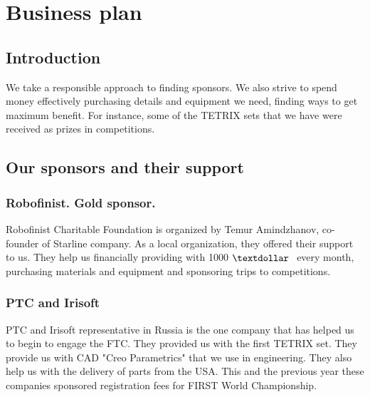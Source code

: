 \section{Business plan}
	\subsection{Introduction}
	We take a responsible approach to finding sponsors. We also strive to spend money effectively purchasing details and equipment we need, finding ways to get maximum benefit. For instance, some of the TETRIX sets that we have were received as prizes in competitions.
	
	\subsection{Our sponsors and their support}
		\subsubsection{Robofinist. Gold sponsor.}	
		Robofinist Charitable Foundation is organized by Temur Amindzhanov, co-founder of Starline company. As a local organization, they offered their support to us. They help us financially providing with 1000 ${\textdollar \text{ }}$ every month, purchasing materials and equipment and sponsoring trips to competitions.
		
		\subsubsection{PTC and Irisoft}
		PTC and Irisoft representative in Russia is the one company that has helped us to begin to engage the FTC. They provided us with the first TETRIX set. They provide us with CAD "Creo Parametrics" that we use in engineering. They also help us with the delivery of parts from the USA. This and the previous year these companies sponsored registration fees for FIRST World Championship.
		
		
